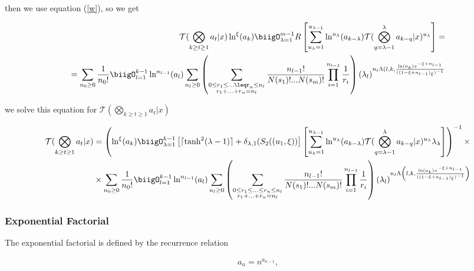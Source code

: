 then we use equation (\ref{w}), so we get

\begin{align}
        \mathcal{T}(\bigotimes_{k \geq t \geq 1}a_t| x) \ln^\xi (a_k) 
        \biigO_{\lambda = 1}^{m-1} R\left[\sum_{u_{\lambda}=1}^{u_{\lambda-1}}
        \ln^{u_{\lambda}}(a_{k-\lambda}) \mathcal{T}(\bigotimes_{q = \lambda-1}^\lambda
        a_{k-q} |x)^{u_{\lambda}} \right] = \\=\sum_{n_0\geq 0}\frac{1}{n_0!}\biigO_{l=1}^{k-1}
        \ln^{n_{l-1}}(a_l) \sum_{n_l\geq0} \left(\sum_{\substack{0\leq r_1 \leq...\leqr_n\leq 
        n_l \\ r_1 +...+r_n = n_l}}\frac{n_{l-1}!}{N(s_1)!...N(s_m)!}\prod_{i=1}^{n_{l-1}} 
        \frac{1}{r_i}\right)(\lambda_l)^{n_l \Lambda(l, k,\frac{\ln(a_k)
        x^{-\xi+n_{l-1}}}{((1-\xi + n_{l-1})_\xi)^{-1}}}
\end{align}

we solve this equation for \( \mathcal{T}(\bigotimes_{k \geq t \geq 1}a_t| x)\)

\begin{align}
        \mathcal{T}(\bigotimes_{k \geq t \geq 1}a_t| x) &=\left(\ln^\xi (a_k) 
        \biigO_{\lambda = 1}^{k-1} \left[ \lceil \tanh^2(\lambda -1)\rceil+
        \delta_{\lambda, 1}(S_2((u_1, \xi))\right]\left[\sum_{u_{\lambda}=1}^{u_{\lambda-1}}
        \ln^{u_{\lambda}}(a_{k-\lambda}) \mathcal{T}(\bigotimes_{q = \lambda-1}^\lambda 
        a_{k-q} |x)^{u_{\lambda}}\lambda_\lambda \right]\right)^{-1}\times \\ &\times 
        \sum_{n_0\geq 0}\frac{1}{n_0!}\biigO_{l=1}^{k-1}
        \ln^{n_{l-1}}(a_l) \sum_{n_l\geq0} \left(\sum_{\substack{0\leq
        r_1 \leq...\leq r_n\leq n_l \\ r_1 +...+r_n = n_l}}\frac{n_{l-1}!}{N(s_1)
        !...N(s_m)!}\prod_{i=1}^{n_{l-1}} \frac{1}{r_i}\right)(\lambda_l)^{n_l 
        \Lambda \left(l, k,\frac{\ln(a_k)x^{-\xi+n_{l-1}}}{((1-\xi + n_{l-1})_\xi)^{-1}}\right)}
\end{align}

\subsubsection{Exponential Factorial}

The exponential factorial is defined by the recurrence relation

\begin{align}
        a_n=n^{a_{n-1}}, 	
\end{align}

